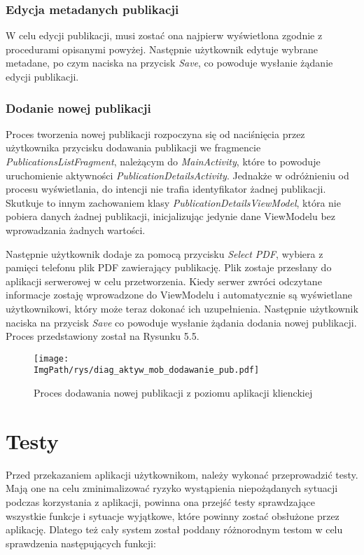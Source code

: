 \documentclass[a4paper,12pt,twoside,openany]{report}
\newcommand{\ImgPath}{.}
\begin{document}
\subsection{Edycja metadanych publikacji}
W celu edycji publikacji, musi zostać ona najpierw wyświetlona zgodnie z procedurami opisanymi powyżej. Następnie użytkownik edytuje wybrane metadane, po czym naciska na przycisk \textit{Save}, co powoduje wysłanie żądanie edycji publikacji.

\subsection{Dodanie nowej publikacji}
Proces tworzenia nowej publikacji rozpoczyna się od naciśnięcia przez użytkownika przycisku dodawania publikacji we fragmencie \textit{PublicationsListFragment}, należącym do \textit{MainActivity}, które to powoduje uruchomienie aktywności \textit{PublicationDetailsActivity}. Jednakże w odróżnieniu od procesu wyświetlania, do intencji nie trafia identyfikator żadnej publikacji. Skutkuje to innym zachowaniem klasy \textit{PublicationDetailsViewModel}, która nie pobiera danych żadnej publikacji, inicjalizując jedynie dane ViewModelu bez wprowadzania żadnych wartości. 

Następnie użytkownik dodaje za pomocą przycisku \textit{Select PDF}, wybiera z pamięci telefonu plik PDF zawierający publikację. Plik zostaje przesłany do aplikacji serwerowej w celu przetworzenia. Kiedy serwer zwróci odczytane informacje zostaję wprowadzone do ViewModelu i automatycznie są wyświetlane użytkownikowi, który może teraz dokonać ich uzupełnienia. Następnie użytkownik naciska na przycisk \textit{Save} co powoduje wysłanie żądania dodania nowej publikacji. Proces przedstawiony został na Rysunku 5.5.

\begin{figure}[!htbp]
	\begin{center}
		\centering
		\texttt{[image: \\ImgPath/rys/diag\_aktyw\_mob\_dodawanie\_pub.pdf]}
	\end{center}
	\caption{Proces dodawania nowej publikacji z poziomu aplikacji klienckiej}
	\label{diagramAktywnosciMobDodEdyt}
\end{figure}



\chapter{Testy}
Przed przekazaniem aplikacji użytkownikom, należy wykonać przeprowadzić testy. Mają one na celu zminimalizować ryzyko wystąpienia niepożądanych sytuacji podczas korzystania z aplikacji, powinna ona przejść testy sprawdzające wszystkie funkcje i sytuacje wyjątkowe, które powinny zostać obsłużone przez aplikację. Dlatego też cały system został poddany różnorodnym testom w celu sprawdzenia następujących funkcji: 
\end{document}
